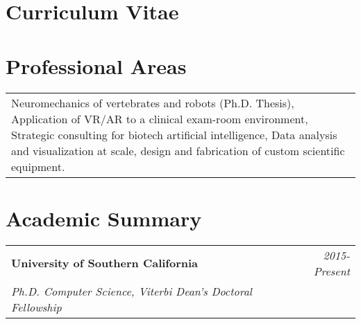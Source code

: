 \documentclass[10pt,a4paper]{article}
\begin{document}
  \newpage


\vspace*{-10mm}\section*{\textbf{Curriculum Vitae}}
\centering{\today}
\vspace*{8mm}\section*{Professional Areas}


  \vspace*{2mm}
  \begin{tabularx}{17cm}{X}
  Neuromechanics of vertebrates and robots (Ph.D. Thesis), Application of VR/AR to a clinical exam-room environment, Strategic consulting for biotech artificial intelligence, Data analysis and visualization at scale, design and fabrication of custom scientific equipment.
  \end{tabularx}



  \vspace*{5mm}\section*{Academic Summary}

  \vspace*{0mm}\noindent\begin{tabularx}{17cm}{X r}
    \textbf{University of Southern California} & \textit{2015-Present} \\
    \textit{Ph.D. Computer Science, Viterbi Dean's Doctoral Fellowship}
  \end{tabularx} 
\end{document}
